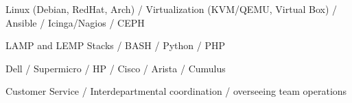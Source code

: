 
\begin{cvskills}

	\cvskill
	{}{Linux (Debian, RedHat, Arch) / Virtualization (KVM/QEMU, Virtual Box) / Ansible / Icinga/Nagios / CEPH}

	\cvskill
	{}{LAMP and LEMP Stacks / BASH / Python / PHP}

	\cvskill
	{}{Dell / Supermicro / HP / Cisco / Arista / Cumulus}

	\cvskill
	{}{Customer Service / Interdepartmental coordination / overseeing team operations}

\end{cvskills}

